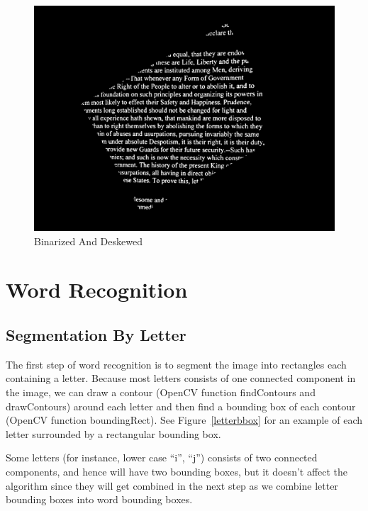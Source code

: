 \documentclass[conference]{IEEEtran}
\begin{document}
\begin{figure}
\center
\includegraphics[scale=0.10]{deskewedImage.jpg}
\caption{Binarized And Deskewed}
\label{deskewed}
\end{figure}

\section{Word Recognition}

\subsection{Segmentation By Letter}
The first step of word recognition is to segment the image into rectangles each containing a letter.  Because most letters consists of one connected component in the image, we can draw a contour (OpenCV function findContours and drawContours) around each letter and then find a bounding box of each contour (OpenCV function boundingRect). See Figure~\ref{letterbbox} for an example of each letter surrounded by a rectangular bounding box.

Some letters (for instance, lower case ``i'', ``j'') consists of two connected components, and hence will have two bounding boxes, but it doesn't affect the algorithm since they will get combined in the next step as we combine letter bounding boxes into word bounding boxes.
\end{document}

